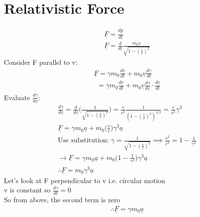 \documentclass[a4paper, 11pt, fleqn, normalem]{report}
\begin{document}
\section{Relativistic Force}
\vspace{-24pt}
\begin{gather*}
    \underline{F} = \frac{d\underline{p}}{dt} \\
    \underline{F} = \frac{d}{dt}\frac{m_{0}\underline{v}}{\sqrt{1 - (\tfrac{v}{c})^{2}}}
\end{gather*}
Consider F parallel to v:
\begin{gather*}
    \underline{F} = \gamma m_{0}\frac{d\underline{v}}{dt} + m_{0}\underline{v}\frac{d\gamma}{dt} \\
    ~~ = \gamma m_{0}\frac{d\underline{v}}{dt} + m_{0}\underline{v}\frac{d\gamma}{d\underline{v}}\cdot\frac{d\underline{v}}{dt}
\end{gather*}
Evaluate $\frac{d\gamma}{d\underline{v}}$:
\begin{gather*}
    \frac{d\gamma}{d\underline{v}} = \frac{d}{d\underline{v}}\Big(\frac{1}{\sqrt{1 - (\tfrac{v}{c})^{2}}}\Big) = \frac{v}{c^{2}}\frac{1}{(1 - (\tfrac{v}{c})^{2})^{3/2}} = \frac{v}{c^{2}}\gamma^{3} \\
    \underline{F} = \gamma m_{0}\underline{a} + m_{0}\Big(\frac{v}{c}\Big)\gamma^{3}\underline{a} \\
    \text{Use substitution: }\gamma = \frac{1}{\sqrt{1 - (\tfrac{v}{c})^{2}}} \implies \frac{v^{2}}{c^{2}} = 1 - \frac{1}{\gamma^{2}} \\
    \rightarrow \underline{F} = \gamma m_{0}\underline{a} + m_{0}\Big(1 - \frac{1}{\gamma^{2}}\Big)\gamma^{3}\underline{a} \\
    \therefore \underline{F} = m_{0}\gamma^{3}\underline{a}
\end{gather*}
Let's look at F perpendicular to v i.e. circular motion \\
v is constant so $\frac{d\gamma}{dt} = 0$ \\
So from above, the second term is zero
\begin{gather*}
    \therefore \underline{F} = \gamma m_{0}\underline{a}
\end{gather*}
\end{document}

